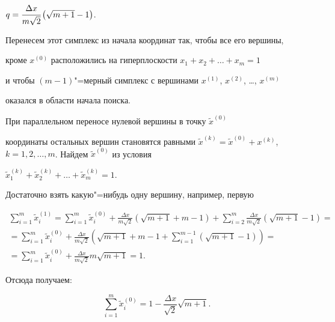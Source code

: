 $q=\cfrac{\Delta x}{m\sqrt 2 }\left( \sqrt {m+1} -1 \right)$.



Перенесем этот симплекс из начала координат так, чтобы все его вершины,

кроме $x^{(0)}$ расположились на гиперплоскости $x_1 +x_2 +\ldots+x_m =1$

и чтобы $(m-1)$"=мерный симплекс с вершинами $x^{(1)}$, $x^{(2)}$, \ldots, $x^{(m)}$

оказался в области начала поиска.



При параллельном переносе нулевой вершины в точку $\tilde {x}^{(0)}$

координаты остальных вершин становятся равными $\tilde {x}^{(k)}=\tilde

{x}^{(0)}+x^{(k)}$, $k=1,2,\ldots,m$. Найдем $\tilde {x}^{(0)}$ из условия

$\tilde {x}_1^{(k)} +\tilde {x}_2^{(k)} +\ldots+ \tilde {x}_m^{(k)} =1$.

Достаточно взять какую"=нибудь одну вершину, например, первую

\begin{multline*}

\sum\limits_{i=1}^m \tilde {x}_i^{(1)} =

\sum\limits_{i=1}^m \tilde {x}_i^{(0)}

+\frac{\Delta x}{m\sqrt 2 }\left( \sqrt {m+1} +m-1 \right)

+\sum\limits_{i=2}^m \frac{\Delta x}{m\sqrt 2 }\left( \sqrt {m+1} -1

\right) =\\

= \sum\limits_{i=1}^m \tilde {x}_i^{(0)}  +\frac{\Delta x}{m\sqrt 2

}\left( \sqrt {m+1} +m-1+\sum\limits_{i=1}^{m-1} \left( \sqrt {m+1} -1

\right) \right)=\\

= \sum\limits_{i=1}^m \tilde {x}_i^{(0)} +\frac{\Delta x}{m\sqrt 2

}m\sqrt {m+1}= 1.

\end{multline*}



Отсюда получаем:

\[

\sum\limits_{i=1}^m \tilde {x}_i^{(0)} =

1-\frac{\Delta x}{\sqrt 2 }\sqrt {m+1}.

\]



